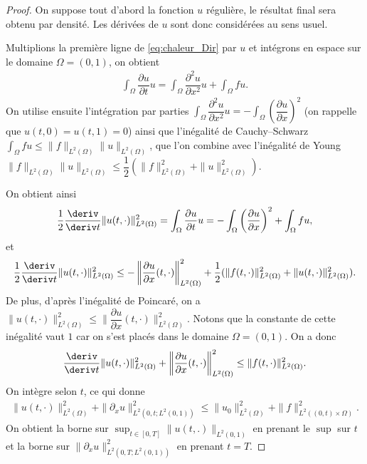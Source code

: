 \documentclass[12pt,a4paper,twoside]{article}
\begin{document}
\begin{proof}
  On suppose tout d'abord la fonction $u$ r\'eguli\`ere, le r\'esultat final
  sera obtenu par densit\'e. Les d\'eriv\'ees de $u$ sont donc consid\'er\'ees au sens usuel.
  
  Multiplions la premi\`ere ligne de \eqref{eq:chaleur_Dir} par $u$
  et int\'egrons en espace sur le domaine $\Omega = (0,1)$,
  on obtient
  \begin{align*}
    \int_{\Omega} \dfrac{\partial u}{\partial t} u = \int_{\Omega} \dfrac{\partial^2 u}{\partial x^2} u 
    + \int_{\Omega} f u .
  \end{align*}
  On utilise ensuite l'int\'egration par parties 
  $\int_{\Omega} \dfrac{\partial^2 u}{\partial x^2} u  
  = - \int_{\Omega} \left(\dfrac{\partial u}{\partial x} \right)^2$
  (on rappelle que $u(t,0) = u(t,1) = 0$)
  ainsi que l'in\'egalit\'e de Cauchy--Schwarz 
  $\int_{\Omega} f u \leq \| f \|_{L^2(\Omega)} \| u \|_{L^2(\Omega)}$,
  que l'on combine avec l'in\'egalit\'e de Young 
  $\| f \|_{L^2(\Omega)} \| u \|_{L^2(\Omega)} \leq \dfrac{1}{2} (\| f \|_{L^2(\Omega)}^2 +  \| u \|_{L^2(\Omega)}^2)$.
  
  On obtient ainsi
  \begin{align*}
    \dfrac{1}{2} \dfrac{\deriv}{\deriv t} \| u(t,\cdot) \|_{L^2(\Omega)}^2
    = \int_{\Omega} \dfrac{\partial u}{\partial t} u
    = - \int_{\Omega} \left(\dfrac{\partial u}{\partial x} \right)^2
    + \int_{\Omega} f u ,
  \end{align*}
  et
  \begin{align*}
    \dfrac{1}{2} \dfrac{\deriv}{\deriv t} \| u(t,\cdot) \|_{L^2(\Omega)}^2
    \leq - \left\| \dfrac{\partial u}{\partial x} (t,\cdot) \right\|_{L^2(\Omega)}^2
    + \dfrac{1}{2}  (\| f (t,\cdot) \|_{L^2(\Omega)}^2 +  \| u (t,\cdot) \|_{L^2(\Omega)}^2) .
  \end{align*}
  De plus, d'apr\`es l'in\'egalit\'e de Poincar\'e, on a 
  $\| u (t,\cdot) \|_{L^2(\Omega)}^2 \leq \| \dfrac{\partial u}{\partial x} (t,\cdot) \|_{L^2(\Omega)}^2$.
  Notons que la constante de cette in\'egalit\'e vaut $1$ car on s'est plac\'es
  dans le domaine $\Omega = (0,1)$.
  On a donc 
  \begin{align*}
    \dfrac{\deriv}{\deriv t} \| u(t,\cdot) \|_{L^2(\Omega)}^2
    + \left\| \dfrac{\partial u}{\partial x} (t,\cdot) \right\|_{L^2(\Omega)}^2
    \leq \| f (t,\cdot) \|_{L^2(\Omega)}^2 .
  \end{align*}
  On int\`egre selon $t$, ce qui donne
  \begin{align*}
    \| u(t,\cdot) \|_{L^2(\Omega)}^2 + \| \partial_x u \|_{L^2(0,t;L^2(0,1))}^2
    \leq \| u_0 \|_{L^2(\Omega)}^2 + \| f \|_{L^2((0,t) \times \Omega)}^2 .
  \end{align*}
  On obtient la borne sur $\sup_{t \in [0,T]} \| u(t,.) \|_{L^2(0,1)}$ en prenant le $\sup$ sur $t$
  et la borne sur $\| \partial_x u \|_{L^2(0,T;L^2(0,1))}^2$ en prenant $t=T$.
\end{proof}
\end{document}
